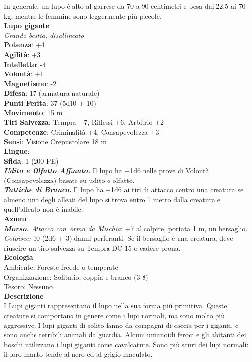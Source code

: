 \begin{multicols}{2}
In generale, un lupo è alto al garrese da 70 a 90 centimetri e pesa dai 22,5 ai 70 kg, mentre le femmine sono leggermente più piccole. \\

\medskip\textbf{Lupo gigante}\\
\emph{Grande bestia, disallineato}\\
\textbf{Potenza}: +4\\
\textbf{Agilità}: +3\\
\textbf{Intelletto}: -4\\
\textbf{Volontà}: +1\\
\textbf{Magnetismo}: -2\\
\textbf{Difesa}: 17 (armatura naturale)\\
\textbf{Punti Ferita}: 37 (5d10 + 10)\\
\textbf{Movimento}: 15 m\\
\textbf{Tiri Salvezza}: Tempra +7, Riflessi +6, Arbitrio +2 \\
\textbf{Competenze}: Criminalità +4, Consapevolezza +3\\
\textbf{Sensi}: Visione Crepuscolare 18 m\\
\textbf{Lingue}: -\\
\textbf{Sfida}: 1 (200 PE)\smallskip\\
\emph{\textbf{Udito e Olfatto Affinato.}} Il lupo ha +1d6 nelle prove di Volontà (Consapevolezza) basate su udito o olfatto.\\
\emph{\textbf{Tattiche di Branco.}} Il lupo ha +1d6 ai tiri di attacco contro una creatura se almeno uno degli alleati del lupo si trova entro 1 metro dalla creatura e quell'alleato non è inabile.\\
\smallskip\textbf{Azioni}\\
\emph{\textbf{Morso.} Attacco con Arma da Mischia}: +7 al colpire, portata 1 m, un bersaglio.\\
\emph{Colpisce:} 10 (2d6 + 3) danni perforanti. Se il bersaglio è una creatura, deve riuscire un tiro salvezza su Tempra DC  15 o cadere prona.\\
\textbf{Ecologia}\\
Ambiente: Foreste fredde o temperate\\
Organizzazione: Solitario, coppia o branco (3-8)\\
Tesoro: Nessuno\\
\textbf{Descrizione}\\

I Lupi giganti rappresentano il lupo nella sua forma più primitiva. Queste creature si comportano in genere come i lupi normali, ma sono molto più aggressive. I lupi giganti di solito fanno da compagni di caccia per i giganti, e sono anche terribili animali da guardia. Alcuni umanoidi feroci e gli abitanti dei boschi utilizzano i lupi giganti come cavalcature. Sono più scuri dei lupi normali: il loro manto tende al nero ed al grigio maculato.\\


\end{multicols}
